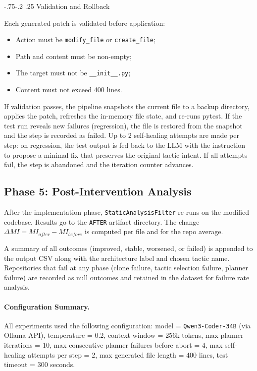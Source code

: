\documentclass[sigconf,review,anonymous]{acmart}
\makeatletter
\renewcommand\subsubsection{\def\@toclevel{3}%
  \@startsection{subsubsection}{3}{\z@}%
  {-.75\baselineskip \@plus -2\p@ \@minus -.2\p@}%
  {.25\baselineskip}%
  {\ACM@NRadjust{\sffamily\bfseries\section@raggedright}}}
\makeatother
\begin{document}
\subsubsection{Validation and Rollback}

Each generated patch is validated before application:
\begin{itemize}[nosep]
    \item Action must be \texttt{modify\_file} or \texttt{create\_file};
    \item Path and content must be non-empty;
    \item The target must not be \texttt{\_\_init\_\_.py};
    \item Content must not exceed 400 lines.
\end{itemize}

If validation passes, the pipeline snapshots the current file to a backup directory, applies the patch, refreshes the in-memory file state, and re-runs pytest. If the test run reveals new failures (regression), the file is restored from the snapshot and the step is recorded as failed. Up to 2 self-healing attempts are made per step: on regression, the test output is fed back to the LLM with the instruction to propose a minimal fix that preserves the original tactic intent. If all attempts fail, the step is abandoned and the iteration counter advances.

\subsection{Phase 5: Post-Intervention Analysis}

After the implementation phase, \texttt{StaticAnalysisFilter} re-runs on the modified codebase. Results go to the \texttt{AFTER} artifact directory. The change $\Delta MI = MI_{after} - MI_{before}$ is computed per file and for the repo average.

A summary of all outcomes (improved, stable, worsened, or failed) is appended to the output CSV along with the architecture label and chosen tactic name. Repositories that fail at any phase (clone failure, tactic selection failure, planner failure) are recorded as null outcomes and retained in the dataset for failure rate analysis.

\paragraph{Configuration Summary.}
All experiments used the following configuration: model = \texttt{Qwen3-Coder-34B} (via Ollama API), temperature = 0.2, context window = 256k tokens, max planner iterations = 10, max consecutive planner failures before abort = 4, max self-healing attempts per step = 2, max generated file length = 400 lines, test timeout = 300 seconds.
\end{document}
